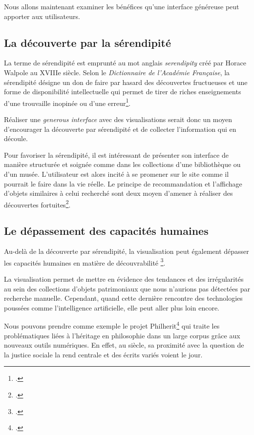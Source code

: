 Nous allons maintenant examiner les bénéfices qu'une \og interface généreuse \fg peut apporter aux utilisateurs.


\subsection{La découverte par la sérendipité}

La terme de sérendipité est emprunté au mot anglais \og \textit{serendipity} \fg créé par Horace Walpole au XVIIIe siècle. Selon le \textit{Dictionnaire de l'Académie Française}, la sérendipité désigne un \og don de faire par hasard des découvertes fructueuses \fg et \og une forme de disponibilité intellectuelle qui permet de tirer de riches enseignements d'une trouvaille inopinée ou d'une erreur\fg\footcite{academiefrancaiseSerendipite}.

Réaliser une \textit{generous interface} avec des visualisations serait donc un moyen d'encourager la découverte par sérendipité et de collecter l'information qui en découle.

Pour favoriser la sérendipité, il est intéressant de présenter son interface de manière structurée et soignée comme dans les collections d'une bibliothèque ou d'un musée. L'utilisateur est alors incité à se promener sur le site comme il pourrait le faire dans la vie réelle. Le principe de recommandation et l'affichage d'objets similaires à celui recherché sont deux moyen d'amener à réaliser des découvertes fortuites\footcite{windhagerVisualizationCulturalHeritage2019}.


\subsection{Le dépassement des capacités humaines}

Au-delà de la découverte par sérendipité, la visualisation peut également \og dépasser les capacités humaines en matière de découvrabilité \fg\footcite{griveauVisualisationDonneesAu2025}. 

La visualisation permet de mettre en évidence des tendances et des irrégularités au sein des collections d'objets patrimoniaux que nous n'aurions pas détectées par recherche manuelle. Cependant, quand cette dernière rencontre des technologies poussées comme l'intelligence artificielle, elle peut aller plus loin encore.

Nous pouvons prendre comme exemple le projet Philherit\footcite{PhilosophieLheritageQuels2024} qui traite les problématiques liées à l'héritage en philosophie dans un large corpus grâce aux nouveaux outils numériques. En effet, au \XIX siècle, sa proximité avec la question de la justice sociale la rend centrale et des écrits variés voient le jour. 

